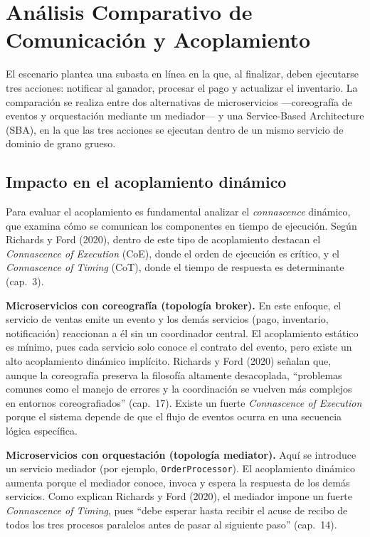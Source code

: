 \documentclass[12pt,a4paper]{article}
\begin{document}
\setcounter{page}{2}

\section{Análisis Comparativo de Comunicación y Acoplamiento}

El escenario plantea una subasta en línea en la que, al finalizar, deben ejecutarse tres acciones: notificar al ganador, procesar el pago y actualizar el inventario. La comparación se realiza entre dos alternativas de microservicios ---coreografía de eventos y orquestación mediante un mediador--- y una Service-Based Architecture (SBA), en la que las tres acciones se ejecutan dentro de un mismo servicio de dominio de grano grueso.

\subsection{Impacto en el acoplamiento dinámico}

Para evaluar el acoplamiento es fundamental analizar el \emph{connascence} dinámico, que examina cómo se comunican los componentes en tiempo de ejecución. Según Richards y Ford (2020), dentro de este tipo de acoplamiento destacan el \emph{Connascence of Execution} (CoE), donde el orden de ejecución es crítico, y el \emph{Connascence of Timing} (CoT), donde el tiempo de respuesta es determinante (cap.~3).

\textbf{Microservicios con coreografía (topología broker).} En este enfoque, el servicio de ventas emite un evento y los demás servicios (pago, inventario, notificación) reaccionan a él sin un coordinador central. El acoplamiento estático es mínimo, pues cada servicio solo conoce el contrato del evento, pero existe un alto acoplamiento dinámico implícito. Richards y Ford (2020) señalan que, aunque la coreografía preserva la filosofía altamente desacoplada, ``problemas comunes como el manejo de errores y la coordinación se vuelven más complejos en entornos coreografiados'' (cap.~17). Existe un fuerte \emph{Connascence of Execution} porque el sistema depende de que el flujo de eventos ocurra en una secuencia lógica específica.

\textbf{Microservicios con orquestación (topología mediator).} Aquí se introduce un servicio mediador (por ejemplo, \texttt{OrderProcessor}). El acoplamiento dinámico aumenta porque el mediador conoce, invoca y espera la respuesta de los demás servicios. Como explican Richards y Ford (2020), el mediador impone un fuerte \emph{Connascence of Timing}, pues ``debe esperar hasta recibir el acuse de recibo de todos los tres procesos paralelos antes de pasar al siguiente paso'' (cap.~14).
\end{document}

